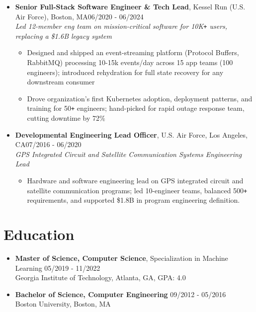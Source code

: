 \documentclass[10pt]{extarticle}
\begin{document}
\begin{itemize}
    \item \textbf{Senior Full-Stack Software Engineer \& Tech Lead}, Kessel Run (U.S. Air Force), Boston, MA\hfill 06/2020 - 06/2024 \\ \emph{Led 12-member eng team on mission-critical software for 10K\texttt{+} users, replacing a \$1.6B legacy system}
    \begin{itemize}
        \itemsep0em
        \item Designed and shipped an event-streaming platform (Protocol Buffers, RabbitMQ) processing 10-15k events/day across 15 app teams (100 engineers); introduced rehydration for full state recovery for any downstream consumer
        \item Drove organization's first Kubernetes adoption, deployment patterns, and training for 50\verb!+! engineers; hand-picked for rapid outage response team, cutting downtime by 72\%
    \end{itemize}
    
    \item \textbf{Developmental Engineering Lead Officer}, U.S. Air Force, Los Angeles, CA\hfill 07/2016 - 06/2020 \\ \emph{GPS Integrated Circuit and Satellite Communication Systems Engineering Lead}
    \begin{itemize}
        \itemsep0em
        \item Hardware and software engineering lead on GPS integrated circuit and satellite communication programs; led 10-engineer teams, balanced 500\verb!+! requirements, and supported \$1.8B in program engineering definition.
    \end{itemize}
    
    \end{itemize} 


\section{Education} \begin{itemize}
    \itemsep0.1em
    \item \textbf{Master of Science, Computer Science}, Specialization in Machine Learning \hfill 05/2019 - 11/2022\\Georgia Institute of Technology, Atlanta, GA, GPA: 4.0
    \item \textbf{Bachelor of Science, Computer Engineering} \hfill 09/2012 - 05/2016\\Boston University, Boston, MA  \end{itemize} 
\end{document}
